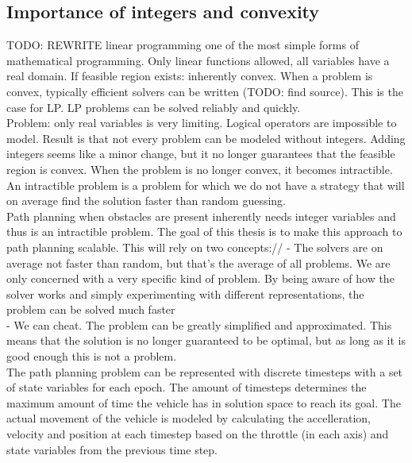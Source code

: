 \subsection{Importance of integers and convexity}
TODO: REWRITE
linear programming one of the most simple forms of mathematical programming. Only linear functions allowed, all variables have a real domain. If feasible region exists: inherently convex. When a problem is convex, typically efficient solvers can be written (TODO: find source). This is the case for LP. LP problems can be solved reliably and quickly.
\\
Problem: only real variables is very limiting. Logical operators are impossible to model. Result is that not every problem can be modeled without integers. Adding integers seems like a minor change, but it no longer guarantees that the feasible region is convex. When the problem is no longer convex, it becomes intractible. An intractible problem is a problem for which we do not have a strategy that will on average find the solution faster than random guessing.
\\
Path planning when obstacles are present inherently needs integer variables and thus is an intractible problem. The goal of this thesis is to make this approach to path planning scalable. This will rely on two concepts://
- The solvers are on average not faster than random, but that's the average of all problems. We are only concerned with a very specific kind of problem. By being aware of how the solver works and simply experimenting with different representations, the problem can be solved much faster\\
- We can cheat. The problem can be greatly simplified and approximated. This means that the solution is no longer guaranteed to be optimal, but as long as it is good enough this is not a problem.\\



\label{section:modeling}
The path planning problem can be represented with discrete timesteps with a set of state variables for each epoch. The amount of timesteps determines the maximum amount of time the vehicle has in solution space to reach its goal. The actual movement of the vehicle is modeled by calculating the accelleration, velocity and position at each timestep based on the throttle (in each axis) and state variables from the previous time step.

